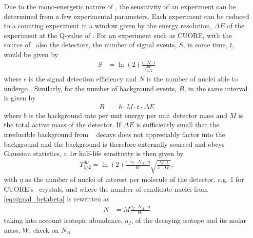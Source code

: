 Due to the mono-energetic nature of \zeronubb, the sensitivity of an experiment can be determined from a few experimental parameters. Each experiment can be reduced to a counting experiment in a window given by the energy resolution, $\Delta E$ of the experiment at the Q-value of \zeronubb. For an experiment such as CUORE, with the source of \zeronubb~also the detectors, the number of signal events, $S$, in some time, $t$, would be given by
\begin{align}
    S &= \ln(2)\frac{\epsilon\cdot N \cdot t}{T^{0\nu}_{1/2}}
    \label{eq:signal_betabeta}
\end{align}
where $\epsilon$ is the signal detection efficiency and $N$ is the number of nuclei able to undergo \zeronubb. Similarly, for the number of background events, $B$, in the same interval is given by
\begin{align}
    B &= b\cdot M \cdot t \cdot \Delta E
    \label{eq:background_betabeta}
\end{align}
where $b$ is the background rate per unit energy per unit detector mass and $M$ is the total active mass of the detector. If $\Delta E$ is sufficiently small that the irreducible background from \twonubb~ decays does not appreciably factor into the background and the background is therefore externally sourced and obeys Gaussian statistics, a $1\sigma$ half-life sensitivity is then given by
\begin{align}
    T^{0\nu}_{1/2}=\ln(2)\frac{\epsilon \cdot a_I \cdot N_A \cdot \eta}{W} \sqrt{\frac{M\cdot t}{b\cdot \Delta E}},
    \label{eq:sensitivity_long}
\end{align}
with $\eta$ as the number of nuclei of interest per molecule of the detector, e.g. 1 for CUORE's \teotwo~crystals, and where the number of candidate nuclei from \autoref{eq:signal_betabeta} is rewritten as
\begin{align}
    N &=M\frac{a_I \cdot N_A\cdot \eta}{W}
\end{align}
taking into account isotopic abundance, $a_I$, of the decaying isotope and its molar mass, $W$. \color{red} check on $N_A$ \color{black}


